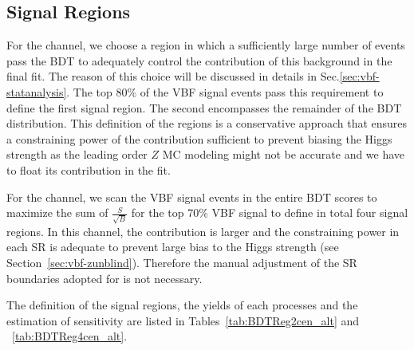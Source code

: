 \subsection{Signal Regions}
For the \twocentral channel, we choose a region in which
a sufficiently large number of \zjets{} events pass the BDT to
adequately control the contribution of this background in the final fit. The reason
of this choice will be discussed in details in Sec.\ref{sec:vbf-statanalysis}.
The top 80\% of the VBF signal events pass this requirement to define the first signal region.
The second encompasses the remainder of the BDT distribution. This definition of the regions
is a conservative approach that ensures a constraining power of the \zjets{} contribution
sufficient to prevent biasing the Higgs strength as the leading order $Z$ MC
modeling might not be accurate and we have to float its contribution in the fit.


For the \fourcentral channel, we scan the VBF signal events in the entire BDT scores to maximize the sum of $\frac{S}{\sqrt{B}}$ for the top 70\% VBF signal to define in total four signal regions. In this channel, the \zjets{} contribution is larger and the constraining power in each SR is adequate to prevent large bias to the Higgs strength (see Section~\ref{sec:vbf-zunblind}).
Therefore the manual adjustment of the SR boundaries adopted for \twocentral is not necessary.

The definition of the signal regions, the yields of each processes and the estimation of sensitivity are listed in Tables~\ref{tab:BDTReg2cen_alt} and ~\ref{tab:BDTReg4cen_alt}. 


